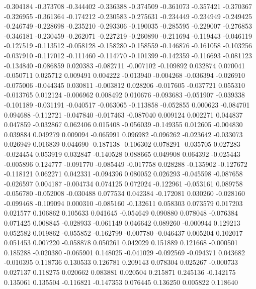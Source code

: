 -0.304184
-0.373708
-0.344402
-0.336388
-0.374509
-0.361073
-0.357421
-0.370367
-0.326955
-0.361364
-0.174212
-0.230583
-0.275631
-0.234449
-0.234949
-0.249425
-0.246749
-0.228698
-0.235210
-0.293306
-0.190035
-0.285595
-0.229007
-0.276853
-0.346181
-0.230459
-0.262071
-0.227219
-0.260890
-0.211694
-0.119443
-0.046119
-0.127519
-0.113512
-0.058128
-0.158280
-0.158559
-0.146876
-0.161058
-0.103256
-0.037910
-0.117012
-0.111460
-0.114770
-0.101399
-0.142359
-0.116693
-0.081123
-0.134840
-0.086859
0.020383
-0.082711
-0.007102
-0.109892
0.032874
0.070041
-0.050711
0.025712
0.009491
0.004222
-0.013940
-0.004268
-0.036394
-0.026910
-0.075006
-0.044345
0.030811
-0.003812
0.028206
-0.017605
-0.037721
0.055310
-0.013765
0.012124
-0.006962
0.008492
0.010676
-0.093683
-0.051907
-0.039338
-0.101189
-0.031191
-0.040517
-0.063065
-0.113858
-0.052855
0.000623
-0.084701
0.094688
-0.112721
-0.047840
-0.017463
-0.087040
0.009124
0.002271
0.044837
0.047859
-0.032867
0.062406
0.015408
-0.056039
-0.149355
0.012605
-0.004830
0.039884
0.049279
0.009094
-0.065991
0.096982
-0.096262
-0.023642
-0.033073
0.026949
0.016839
0.044690
-0.187138
-0.106302
0.078291
-0.035705
0.027283
-0.024454
0.053919
0.032847
-0.140528
0.088665
0.049908
0.064392
-0.025443
-0.005896
0.124777
-0.091770
-0.085449
-0.017758
0.028288
-0.135902
-0.127672
-0.118121
0.062271
0.042331
-0.094396
0.080052
0.026293
-0.045598
-0.087658
-0.026597
0.004187
-0.004734
0.074125
0.072024
-0.122961
-0.053161
0.089758
-0.056780
-0.052008
-0.030488
0.077534
0.042384
-0.172081
0.030260
-0.028160
-0.099468
-0.109094
0.000310
-0.085160
-0.132611
0.058303
0.073579
0.017203
0.021577
0.106862
0.105633
0.041645
-0.054649
0.090880
0.078048
-0.076384
0.071425
0.008845
-0.028933
-0.061149
0.046642
0.089260
-0.000944
0.129213
0.052582
0.019862
-0.055852
-0.162799
-0.007780
-0.046437
0.005204
0.102017
0.051453
0.007220
-0.058878
0.050261
0.042029
0.151889
0.121668
-0.000501
0.185288
-0.020380
-0.065901
0.148025
-0.041029
-0.092569
-0.094371
0.043682
-0.010395
0.118736
0.130533
0.126781
0.209143
0.078304
0.025267
-0.000733
0.027137
0.118275
0.020662
0.083881
0.020504
0.215871
0.245136
-0.142175
0.135061
0.135504
-0.116821
-0.147353
0.076445
0.136250
0.005822
0.118640
